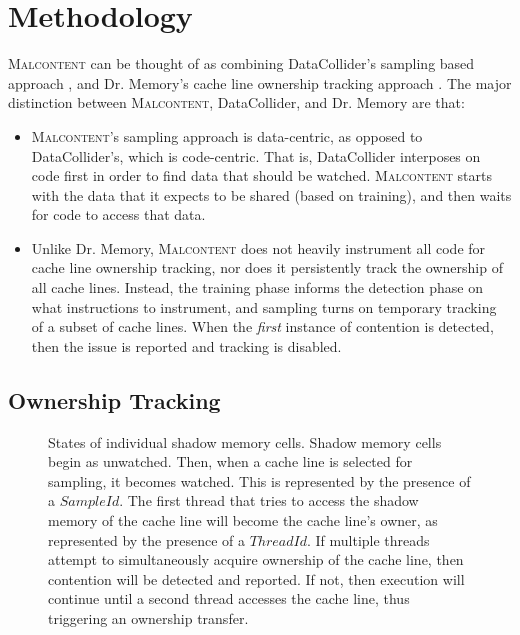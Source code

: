 \documentclass[letterpaper,twocolumn,10pt]{article}
\newcommand{\TextToolname}{Malcontent}
\newcommand{\Toolname}{\textsc{\TextToolname{}}}
\begin{document}


\section{Methodology}\label{sec:methodology}

\Toolname{} can be thought of as combining DataCollider's sampling based approach \cite{DataCollider}, and Dr. Memory's
cache line ownership tracking approach \cite{DrContention}. The major distinction between \Toolname, DataCollider, and
Dr. Memory are that:
\begin{itemize}
\item \Toolname's sampling approach is data-centric, as opposed to DataCollider's, which is code-centric. That is, DataCollider
interposes on code first in order to find data that should be watched. \Toolname{} starts with the data that it expects to
be shared (based on training), and then waits for code to access that data.

\item Unlike Dr. Memory, \Toolname{} does not heavily instrument all code for cache line ownership tracking, nor does it
persistently track the ownership of all cache lines. Instead, the training phase informs the detection phase on what
instructions to instrument, and sampling turns on temporary tracking of a subset of cache lines. When the \emph{first}
instance of contention is detected, then the issue is reported and tracking is disabled.
\end{itemize}

\subsection{Ownership Tracking}
\begin{figure}
\begin{center}
\end{center}
\caption{\label{fig:states_of_shadow}States of individual shadow memory cells. Shadow memory cells begin as unwatched. %
Then, when a cache line is selected for sampling, it becomes watched. This is represented by the presence of a $SampleId$. %
The first thread that tries to access the shadow memory of the cache line will become the cache line's owner, as represented %
by the presence of a $ThreadId$. If multiple threads attempt to simultaneously acquire ownership of the cache line, then %
contention will be detected and reported. If not, then execution will continue until a second thread accesses the cache line, %
thus triggering an ownership transfer.}
\end{figure}
\end{document}
